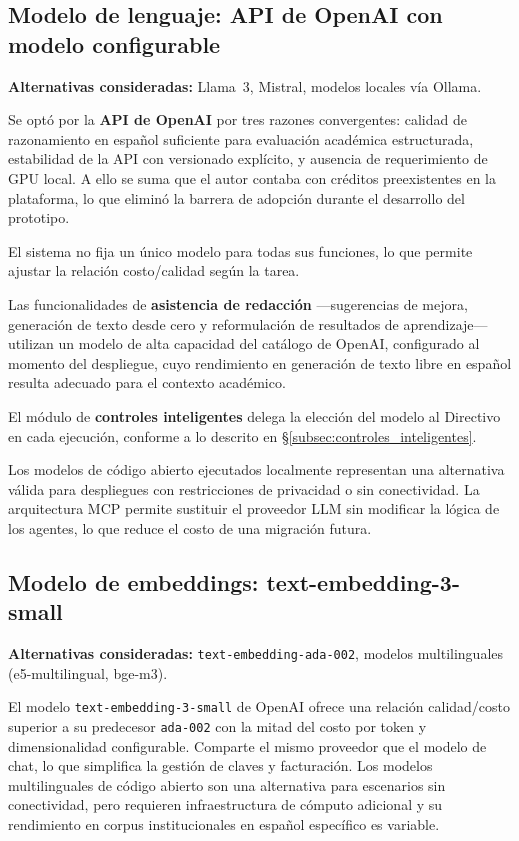 \subsection*{Modelo de lenguaje: API de OpenAI con modelo configurable}

\textbf{Alternativas consideradas:} Llama~3, Mistral, modelos locales
vía Ollama.

Se optó por la \textbf{API de OpenAI} por tres razones convergentes:
calidad de razonamiento en español suficiente para evaluación académica
estructurada, estabilidad de la API con versionado explícito, y ausencia
de requerimiento de GPU local.
A ello se suma que el autor contaba con créditos preexistentes en la
plataforma, lo que eliminó la barrera de adopción durante el desarrollo
del prototipo.

El sistema no fija un único modelo para todas sus funciones, lo que
permite ajustar la relación costo/calidad según la tarea.

Las funcionalidades de \textbf{asistencia de redacción} —sugerencias de
mejora, generación de texto desde cero y reformulación de resultados de
aprendizaje— utilizan un modelo de alta capacidad del catálogo de OpenAI,
configurado al momento del despliegue, cuyo rendimiento en generación de
texto libre en español resulta adecuado para el contexto académico.

El módulo de \textbf{controles inteligentes} delega la elección del modelo
al Directivo en cada ejecución, conforme a lo descrito en
\S\ref{subsec:controles_inteligentes}.

Los modelos de código abierto ejecutados localmente representan una
alternativa válida para despliegues con restricciones de privacidad
o sin conectividad.
La arquitectura MCP permite sustituir el proveedor LLM sin modificar
la lógica de los agentes, lo que reduce el costo de una migración futura.

\subsection*{Modelo de embeddings: text-embedding-3-small}

\textbf{Alternativas consideradas:} \texttt{text-embedding-ada-002},
modelos multilinguales (e5-multilingual, bge-m3).

El modelo \texttt{text-embedding-3-small} de OpenAI ofrece una relación
calidad/costo superior a su predecesor \texttt{ada-002} con la mitad del
costo por token y dimensionalidad configurable.
Comparte el mismo proveedor que el modelo de chat, lo que simplifica la
gestión de claves y facturación.
Los modelos multilinguales de código abierto son una alternativa para
escenarios sin conectividad, pero requieren infraestructura de cómputo
adicional y su rendimiento en corpus institucionales en español
específico es variable.

